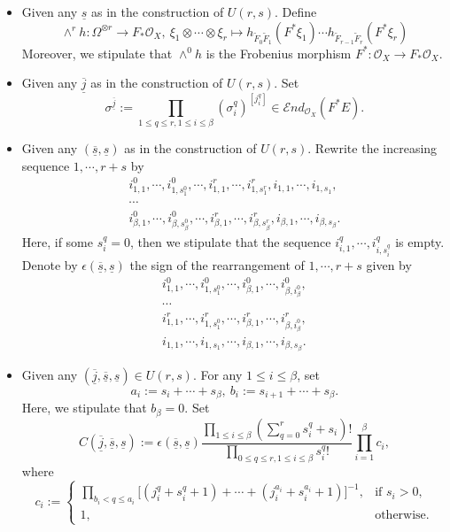 \documentclass[12pt, a4paper]{article}
\begin{document}
\begin{itemize}
\item Given any $\underline s$ as in the construction of $U(r,s)$. Define 
$$
\wedge^rh:\Omega^{\otimes r}\to F_*\mathcal O_X,~\xi_1\otimes\cdots\otimes\xi_r\mapsto h_{\tilde F_0\tilde F_1}(F^*\xi_1)\cdots h_{\tilde F_{r-1}\tilde F_r}(F^*\xi_r)
$$
Moreover, we stipulate that $\wedge^0h$ is the Frobenius morphism $F^*:\mathcal O_X\to F_*\mathcal O_X$.
    
\item Given any $\overline{\underline j}$ as in the construction of $U(r,s)$. Set 
$$
\sigma^{\underline{\overline j}}:=\prod_{1\leq q\leq r,1\leq i\leq\beta}(\sigma^q_i)^{[j^q_i]}\in\mathcal End_{\mathcal O_X}(F^*E).
$$
\item Given any $(\underline{\overline s},\underline s)$ as in the construction of $U(r,s)$. Rewrite the increasing sequence $1,\cdots,r+s$ by 
$$
\begin{array}{c}
i^0_{1,1},\cdots,i^0_{1,s^0_1},\cdots,i^r_{1,1},\cdots,i^r_{1,s^r_1},i_{1,1},\cdots,i_{1,s_1},\\
\cdots\\
i^0_{\beta,1},\cdots,i^0_{\beta,s^0_\beta},\cdots,i^r_{\beta,1},\cdots,i^r_{\beta,s^r_\beta},i_{\beta,1},\cdots,i_{\beta,s_\beta}.
\end{array}
$$
Here, if some $s^q_i=0$, then we stipulate that the sequence $i^q_{i,1},\cdots,i^q_{i,s^q_i}$ is empty.
Denote by $\epsilon(\underline{\overline s},\underline s)$ the sign of the rearrangement of $1,\cdots,r+s$ given by
$$
\begin{array}{c}
  i^0_{1,1},\cdots,i^0_{1,s^0_1},\cdots,i^0_{\beta,1},\cdots,i^0_{\beta,i^0_\beta},\\
  \cdots\\
  i^r_{1,1},\cdots,i^r_{1,s^0_1},\cdots,i^r_{\beta,1},\cdots,i^r_{\beta,i^0_\beta},\\
  i_{1,1},\cdots,i_{1,s_1},\cdots,i_{\beta,1},\cdots,i_{\beta,s_\beta}.
\end{array}
$$
\item 
 Given any $(\overline{\underline j},\underline{\overline s},\underline s)\in U(r,s)$.  For any \( 1 \leq i \leq \beta \), set  
\[
a_i :=s_i+\cdots+s_\beta,~ 
b_i := s_{i+1}+\cdots+s_\beta.
\]
Here, we stipulate that $b_\beta=0$.
Set  
$$C(\underline{\overline{j}},\underline{\overline s},\underline s) := \epsilon(\underline{\overline s},\underline s)\frac{\prod_{1\leq i\leq\beta}(\sum_{q=0}^rs^q_i+s_i)!}{\prod_{0\leq q\leq r,1\leq i\leq\beta}s^q_i!}\prod_{i=1}^\beta c_i,$$
where  
\[
c_i := 
\begin{cases}
\prod_{b_i<q \leq a_i} \Big[ (j^q_i+ s^q_i+1) + \cdots + (j^{a_i}_i+ s^{a_i}_i+1) \Big]^{-1}, & \text{if } s_i > 0, \\
1, & \text{otherwise}.
\end{cases}
\]
    \end{itemize}
\end{document}
